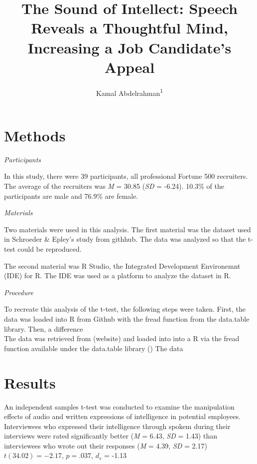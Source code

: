 \documentclass[man]{apa6}
\title{The Sound of Intellect: Speech Reveals a Thoughtful Mind, Increasing a
Job Candidate's Appeal}
\author{Kamal Abdelrahman\textsuperscript{1}}
\date{}
\affiliation{
\vspace{0.5cm}
\textsuperscript{1} City University of New York - Brooklyn College}
\begin{document}
\maketitle

\section{Methods}\label{methods}

\emph{Participants}

In this study, there were 39 participants, all professional Fortune 500
recruiters. The average of the recruiters was \emph{M} = 30.85
(\emph{SD} = -6.24). 10.3\% of the participants are male and 76.9\% are
female.

\emph{Materials}

Two materials were used in this analysis. The first material was the
dataset used in Schroeder \& Epley's study from githhub. The data was
analyzed so that the t-test could be reproduced.

The second material was R Studio, the Integrated Development Environemnt
(IDE) for R. The IDE was used as a platform to analyze the dataset in R.

\emph{Procedure}

To recreate this analysis of the t-test, the following steps were taken.
First, the data was loaded into R from Github with the fread function
from the data.table library. Then, a difference\\
The data was retrieved from (website) and loaded into into a R via the
fread function available under the data.table library () The data

\section{Results}\label{results}

An independent samples t-test was conducted to examine the manipulation
effects of audio and written expressions of intelligence in potential
employees. Interviewees who expressed their intelligence through spokem
during their interviews were rated significantly better (\emph{M} =
6.43, \emph{SD} = 1.43) than interviewees who wrote out their responses
(\emph{M} = 4.39, \emph{SD} = 2.17) \(t(34.02) = -2.17\), \(p = .037\),
\(d_{s}\) = -1.13
\end{document}
